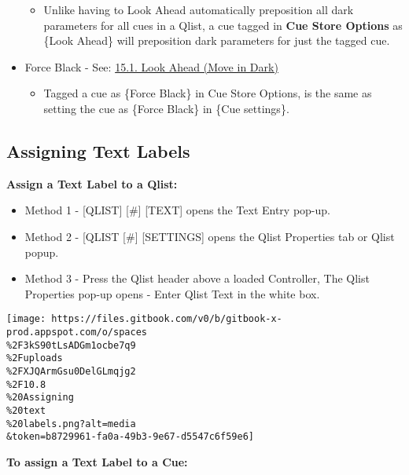 \documentclass[
]{article}
\providecommand{\tightlist}{%
  \setlength{\itemsep}{0pt}\setlength{\parskip}{0pt}}
\begin{document}
\begin{itemize}
  \begin{itemize}
  \tightlist
  \item
    Unlike having to Look Ahead automatically preposition all dark parameters for all cues in a Qlist, a cue tagged in \textbf{Cue Store Options} as \{Look Ahead\} will preposition dark parameters for just the tagged cue.
  \end{itemize}
\item
  Force Black - See: \href{https://vibemanual.compulite.com/dark-parameter-positioning.html\#look-ahead-move-in-dark}{15.1. Look Ahead (Move in Dark)}

  \begin{itemize}
  \tightlist
  \item
    Tagged a cue as \{Force Black\} in Cue Store Options, is the same as setting the cue as \{Force Black\} in \{Cue settings\}.
  \end{itemize}
\end{itemize}

\hypertarget{assigning-text-labels}{%
\subsection{Assigning Text Labels}\label{assigning-text-labels}}

\textbf{Assign a Text Label to a Qlist:}

\begin{itemize}
\item
  Method 1 - {[}QLIST{]} {[}\#{]} {[}TEXT{]} opens the Text Entry pop-up.
\item
  Method 2 - {[}QLIST {[}\#{]} {[}SETTINGS{]} opens the Qlist Properties tab or Qlist popup.
\item
  Method 3 - Press the Qlist header above a loaded Controller, The Qlist Properties pop-up opens - Enter Qlist Text in the white box.
\end{itemize}

\texttt{[image: https://files.gitbook.com/v0/b/gitbook-x-prod.appspot.com/o/spaces\\\%2F3kS90tLsADGm1ocbe7q9\\\%2Fuploads\\\%2FXJQArmGsu0DelGLmqjg2\\\%2F10.8\\\%20Assigning\\\%20text\\\%20labels.png?alt=media\\\&token=b8729961-fa0a-49b3-9e67-d5547c6f59e6]}

\textbf{To assign a Text Label to a Cue:}
\end{document}
